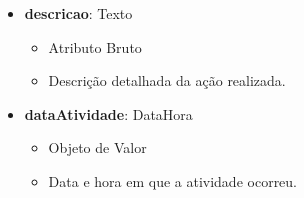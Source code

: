 \begin{itemize}
        \item \textbf{descricao}: Texto  
              \begin{itemize}
                  \item Atributo Bruto
                  \item Descrição detalhada da ação realizada.
              \end{itemize}
    
        \item \textbf{dataAtividade}: DataHora  
              \begin{itemize}
                  \item Objeto de Valor
                  \item Data e hora em que a atividade ocorreu.
              \end{itemize}
    \end{itemize}
    

